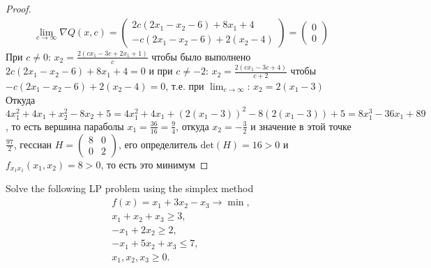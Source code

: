 \begin{proof}
    \begin{gather*}
        \lim_{c \rightarrow \infty}
        \nabla Q(x, c) =
        \begin{pmatrix}
            2c(2x_1 - x_2 - 6) + 8x_1 + 4\\
            -c(2x_1 - x_2 - 6) + 2(x_2 - 4)
        \end{pmatrix}
        =
        \begin{pmatrix}
            0\\ 0
        \end{pmatrix}
    \end{gather*}
    При $c \ne 0$: $x_2 = \frac{2(cx_1 - 3c + 2x_1 + 1)}{c}$ чтобы было выполнено $2c(2x_1 - x_2 - 6) + 8x_1 + 4 = 0$ и при $c \ne -2$: $x_2 = \frac{2(cx_1 - 3c + 4)}{c + 2}$ чтобы $-c(2x_1 - x_2 - 6) + 2(x_2 - 4) = 0$, т.е. при $\lim_{c \rightarrow \infty}$: $x_2 = 2(x_1 - 3)$\\
    Откуда $4x_1^2 + 4x_1 + x_2^2 - 8x_2 + 5 = 4x_1^2 + 4x_1 + (2(x_1 - 3))^2 - 8(2(x_1 - 3)) + 5 = 8x_1^3 - 36x_1 + 89$, то есть вершина параболы $x_1 = \frac{36}{16} = \frac{9}{4}$, откуда $x_2 = -\frac{3}{2}$ и значение в этой точке $\frac{97}{2}$, гессиан $H = \begin{pmatrix} 8 & 0\\ 0 & 2 \end{pmatrix}$, его определитель $\text{det}(H) = 16 > 0$ и $f_{x_1 x_1}(x_1, x_2) = 8 > 0$, то есть это минимум
\end{proof}
\vskip 0.4in





\begin{prob}
    Solve the following LP problem using the simplex method
    \begin{gather*}
        f(x) = x_1 + 3x_2 - x_3 \rightarrow \min , \\
        x_1 + x_2 + x_3 \geq 3, \\
        -x_1 + 2x_2 \geq 2, \\
        -x_1 + 5x_2 + x_3 \leq 7, \\
        x_1, x_2, x_3 \geq 0 .
    \end{gather*}
\end{prob}

